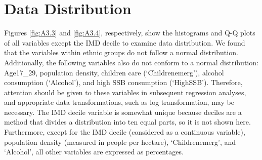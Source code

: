 \section{Data Distribution}
\label{sec:3.3}
Figures \ref{fig:A3.3} and \ref{fig:A3.4}, respectively, show the histograms and Q-Q plots of all variables except the IMD decile to examine data distribution. We found that the variables within ethnic groups do not follow a normal distribution. Additionally, the following variables also do not conform to a normal distribution: Age17\_29, population density, children care (`Childrenemerg'), alcohol consumption (`Alcohol'), and high SSB consumption (`HighSSB'). Therefore, attention should be given to these variables in subsequent regression analyses, and appropriate data transformations, such as log transformation, may be necessary. The IMD decile variable is somewhat unique because deciles are a method that divides a distribution into ten equal parts, so it is not shown here. Furthermore, except for the IMD decile (considered as a continuous variable), population density (measured in people per hectare), `Childrenemerg', and `Alcohol', all other variables are expressed as percentages.

